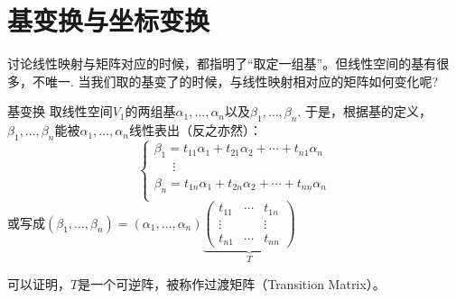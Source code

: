 
\section{基变换与坐标变换}


\begin{frame}

{\large
\hspace*{2em}讨论线性映射与矩阵对应的时候，都指明了``取定一组基''。但线性空间的基有很多，不唯一. 当我们取的基变了的时候，与线性映射相对应的矩阵如何变化呢?
}

\end{frame}


\begin{frame}

\begin{block}{基变换}
取线性空间$V_1$的两组基$\alpha_1,\ldots,\alpha_n$以及$\beta_1,\ldots,\beta_n$. 于是，根据基的定义，$\beta_1,\ldots,\beta_n$能被$\alpha_1,\ldots,\alpha_n$线性表出（反之亦然）：
\[
\begin{cases}
\beta_1 = t_{11}\alpha_1 + t_{21}\alpha_2 + \cdots + t_{n1}\alpha_n \\
\phantom{yyy} \vdots \\
\beta_n = t_{1n}\alpha_1 + t_{2n}\alpha_2 + \cdots + t_{nn}\alpha_n \\
\end{cases}
\]
或写成\(\displaystyle (\beta_1,\ldots,\beta_n) = (\alpha_1,\ldots,\alpha_n) \underbrace{\begin{pmatrix} t_{11} & \cdots & t_{1n} \\ \vdots & & \vdots \\ t_{n1} & \cdots & t_{nn} \end{pmatrix}}_T\)

可以证明，$T$是一个可逆阵，被称作过渡矩阵（Transition Matrix）。
\end{block}

\end{frame}


